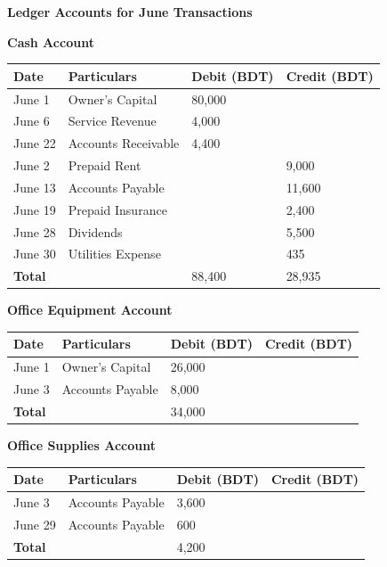 \documentclass[12pt,a4paper]{book}
\begin{document}
\clearpage
\textbf{Ledger Accounts for June Transactions}
\begin{center}
\textbf{Cash Account}

\begin{tabular}{|p{2cm}|p{8cm}|p{2.5cm}|p{2.7cm}|}
\hline
\textbf{Date} & \textbf{Particulars} & \textbf{Debit (BDT)} & \textbf{Credit (BDT)} \\
\hline
June 1 & Owner's Capital & 80,000 & \\
June 6 & Service Revenue & 4,000 & \\
June 22 & Accounts Receivable & 4,400 & \\
June 2 & Prepaid Rent & & 9,000 \\
June 13 & Accounts Payable & & 11,600 \\
June 19 & Prepaid Insurance & & 2,400 \\
June 28 & Dividends & & 5,500 \\
June 30 & Utilities Expense & & 435 \\
\hline
\textbf{Total} & & 88,400 & 28,935 \\
\hline
\end{tabular}
\end{center}

\vspace{0.5cm}

\begin{center}
\textbf{Office Equipment Account} \\ 
\begin{tabular}{|p{2cm}|p{8cm}|p{2.5cm}|p{2.7cm}|}
\hline
\textbf{Date} & \textbf{Particulars} & \textbf{Debit (BDT)} & \textbf{Credit (BDT)} \\
\hline
June 1 & Owner’s Capital & 26,000 & \\
June 3 & Accounts Payable & 8,000 & \\
\hline
\textbf{Total} & & 34,000 &  \\
\hline
\end{tabular}
\end{center}

\vspace{0.5cm}

\begin{center}
\textbf{Office Supplies Account}\\ 
\begin{tabular}{|p{2cm}|p{8cm}|p{2.5cm}|p{2.7cm}|}
\hline
\textbf{Date} & \textbf{Particulars} & \textbf{Debit (BDT)} & \textbf{Credit (BDT)} \\
\hline
June 3 & Accounts Payable & 3,600 & \\
June 29 & Accounts Payable & 600 & \\
\hline
\textbf{Total} & & 4,200 & \\
\hline
\end{tabular}
\end{center}
\end{document}
